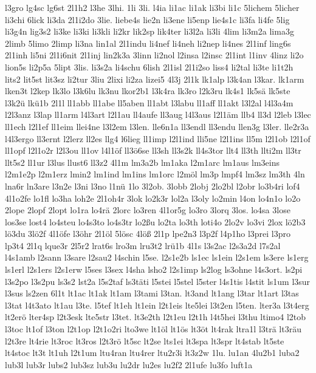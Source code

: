 {l3gro
lg4sc
lg6st
2l1h2
l3he
3lhi.
1li
3li.
l4ia
li1ac
li1ak
li3bi
li1c
5lichem
5licher
li3chi
6lick
li3da
2l1i2do
3lie.
liebe4s
lie2n
li3ene
li5enp
lie4s1c
li3fa
li4fe
5lig
li3g4n
lig3s2
li3ke
li3ki
li3kli
li2kr
lik2sp
lik4ter
li3l2a
li3li
4lim
li3m2a
lima3g
2limb
5limo
2limp
li3na
lin1al
2l1indu
li4nef
li4neh
li2nep
li4nes
2l1inf
ling6s
2l1inh
li5ni
2l1i6nit
2l1inj
lin2k3a
3linn
li2nol
l2insa
l2insc
2l1int
l1inv
4linz
li2o
lion5s
li2p5a
5lipt
3lis.
li3s2a
li4schu
6lish
2l1isl
2l1i2so
liss4
li2tal
li3te
li1t2h
lits2
lit5st
lit3sz
li2tur
3liu
2lixi
li2za
lizei5
4l3j
2l1k
lk1alp
l3k4an
l3kar.
lk1arm
lken3t
l2kep
lk3lo
l3k6lu
lk3nu
lkor2b1
l3k4ra
lk3ro
l2k3ru
lk4s1
lk5sä
lk5ste
l3k2ü
lkü1b
2l1l
ll1abb
ll1abe
ll5aben
ll1abt
l3labu
ll1aff
ll1akt
l3l2al
l4l3a4m
l2l3anz
l3lap
ll1arm
l4l3art
l2l1au
ll4aufe
ll3aug
l4l3aus
l2l1äm
llb4
ll3d
l2leb
l3lec
ll1ech
l2l1ef
ll1eim
llei4ne
l3l2em
l3len.
lle6n1a
ll3endl
ll3endu
llen3g
l3ler.
lle2r3a
l4l3ergo
ll3ernt
l2lerz
ll2es
llg4
l6lieg
ll1imp
l2l1ind
lli5ne
l2l1ins
ll5m
l2l1ob
l2l1of
ll1opf
l2l1o2r
l2l3ou
ll1ov
l4l1öf
ll3ö6se
ll3sh
ll3s2k
ll4s3tor
llt4
ll3th
llti2m
ll3tr
llt5s2
ll1ur
l3lus
llust6
ll3z2
4l1m
lm3a2b
lm1aka
l2m1arc
lm1aus
lm3eins
l2m1e2p
l2m1erz
lmin2
lm1ind
lm1ins
lm1orc
l2möl
lm3p
lmpf4
lm3sz
lm3th
4ln
lna6r
ln3are
l3n2e
l3ni
l3no
l1nü
1lo
3l2ob.
3lobb
2lobj
2lo2bl
l2obr
lo3b4ri
lof4
4l1o2fe
lo1fl
lo3ha
loh2e
2l1oh4r
3lok
lo2k3r
lol2a
l3oly
lo2min
l4on
lo4n1o
lo2o
2lope
2lopf
2lopt
lo1ra
lo4rä
2lorc
lo3ren
4l1or5g
lo3ro
3lorq
3los.
lo4sa
3lose
los3se
lost4
lo4steu
lo4s3to
lo4s3tr
lo2ßu
lo2ta
lo3th
loti4o
2lo2v
lo3vi
2lox
lö2b3
lö3du
3lö2f
4l1öfe
l3öhr
2l1öl
5lösc
4löß
2l1p
lpe2n3
l3p2f
l4p1ho
l3prei
l3pro
lp3t4
2l1q
lque3r
2l5r2
lrat6s
lro3m
lru3t2
lrü1b
4l1s
l3s2ac
l2s3a2d
l7s2al
l4s1amb
l2sann
l3sare
l2sau2
l4schin
l5se.
l2s1e2b
ls1ec
ls1ein
l2s1em
ls3ere
ls1erg
ls1erl
l2s1ers
l2s1erw
l5ses
l3sex
l4sha
lsho2
l2s1imp
ls2log
ls3ohne
l4s3ort.
ls2pi
l3s2po
l3s2pu
ls3s2
lst2a
l5s2taf
ls3täti
l5stei
l5stel
l5ster
l4s1tis
l4stit
ls1um
l3sur
l3sus
ls2zen
6l1t
lt1ac
lt1ak
lt1am
l3tami
l3tan.
lt3and
lt1ang
l3tar
lt1art
l3tas
l3tat
l4t3ato
lt1au
l3te.
l5tef
lt1eh
lt1ein
l2t1eis
lte5lei
l3t2en
l5ten.
lter3a
l3t4erg
lt2erö
lter4sp
l2t3esk
lte5str
l3tet.
lt3e2th
l2t1eu
l2t1h
l4t5hei
l3thu
ltimo4
l2tob
l3toc
lt1of
l3ton
l2t1op
l2t1o2ri
lto3we
lt1öl
lt1ös
lt3öt
lt4rak
ltra1l
l3trä
lt3räu
l2t3re
lt4rie
lt3roc
lt3ros
l2t3rö
lt5sc
lt2se
lts1ei
lt3spa
lt3spr
lt4stab
lt5ste
lt4stoc
lt3t
lt1uh
l2t1um
ltu4ran
ltu4rer
ltu2r3i
lt3z2w
1lu.
lu1an
4lu2b1
luba2
lub3l
lub3r
lubs2
lub3sz
lub3u
lu2dr
lu2es
lu2f2
2l1ufe
lu3fo
luft1a
}
